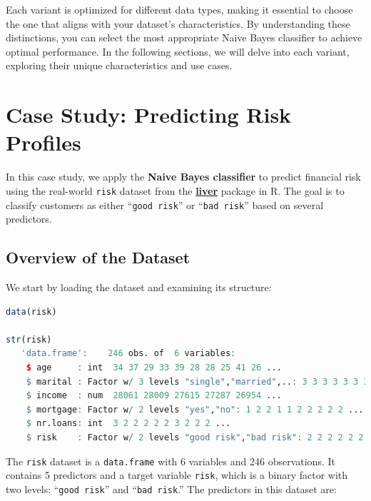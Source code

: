 \documentclass[
]{book}
\newcommand{\passthrough}[1]{#1}
\theoremstyle{definition}
\theoremstyle{definition}
\theoremstyle{definition}
\theoremstyle{definition}
\theoremstyle{remark}
\begin{document}
Each variant is optimized for different data types, making it essential to choose the one that aligns with your dataset's characteristics. By understanding these distinctions, you can select the most appropriate Naive Bayes classifier to achieve optimal performance. In the following sections, we will delve into each variant, exploring their unique characteristics and use cases.

\section{Case Study: Predicting Risk Profiles}\label{case-study-predicting-risk-profiles}

In this case study, we apply the \textbf{Naive Bayes classifier} to predict financial risk using the real-world \passthrough{\lstinline!risk!} dataset from the \href{https://CRAN.R-project.org/package=liver}{\textbf{liver}} package in R. The goal is to classify customers as either ``\passthrough{\lstinline!good risk!}'' or ``\passthrough{\lstinline!bad risk!}'' based on several predictors.

\subsection*{Overview of the Dataset}\label{overview-of-the-dataset-1}

We start by loading the dataset and examining its structure:

\begin{lstlisting}[language=R]
data(risk)

str(risk)
   'data.frame':    246 obs. of  6 variables:
    $ age     : int  34 37 29 33 39 28 28 25 41 26 ...
    $ marital : Factor w/ 3 levels "single","married",..: 3 3 3 3 3 3 3 3 3 3 ...
    $ income  : num  28061 28009 27615 27287 26954 ...
    $ mortgage: Factor w/ 2 levels "yes","no": 1 2 2 1 1 2 2 2 2 2 ...
    $ nr.loans: int  3 2 2 2 2 2 3 2 2 2 ...
    $ risk    : Factor w/ 2 levels "good risk","bad risk": 2 2 2 2 2 2 2 2 2 2 ...
\end{lstlisting}

The \passthrough{\lstinline!risk!} dataset is a \passthrough{\lstinline!data.frame!} with 6 variables and 246 observations. It contains 5 predictors and a target variable \passthrough{\lstinline!risk!}, which is a binary factor with two levels: ``\passthrough{\lstinline!good risk!}'' and ``\passthrough{\lstinline!bad risk!}.'' The predictors in this dataset are:
\end{document}
